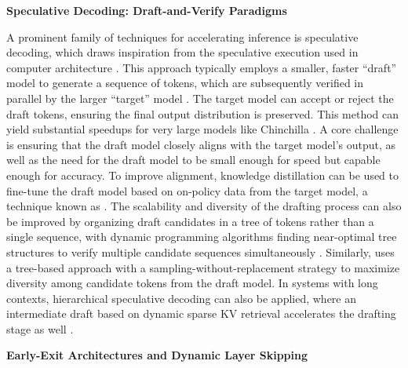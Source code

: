 \documentclass[11pt]{article}
\begin{document}
\textbf{Speculative Decoding: Draft-and-Verify Paradigms}

A prominent family of techniques for accelerating inference is speculative decoding, which draws inspiration from the speculative execution used in computer architecture \cite{ref323}. This approach typically employs a smaller, faster ``draft'' model to generate a sequence of tokens, which are subsequently verified in parallel by the larger ``target'' model \cite{ref324}. The target model can accept or reject the draft tokens, ensuring the final output distribution is preserved. This method can yield substantial speedups for very large models like Chinchilla \cite{ref324}. A core challenge is ensuring that the draft model closely aligns with the target model's output, as well as the need for the draft model to be small enough for speed but capable enough for accuracy. To improve alignment, knowledge distillation can be used to fine-tune the draft model based on on-policy data from the target model, a technique known as \cite{ref325}. The scalability and diversity of the drafting process can also be improved by organizing draft candidates in a tree of tokens rather than a single sequence, with dynamic programming algorithms finding near-optimal tree structures to verify multiple candidate sequences simultaneously \cite{ref326}. Similarly, \cite{ref327} uses a tree-based approach with a sampling-without-replacement strategy to maximize diversity among candidate tokens from the draft model. In systems with long contexts, hierarchical speculative decoding can also be applied, where an intermediate draft based on dynamic sparse KV retrieval accelerates the drafting stage as well \cite{ref328}.

\textbf{Early-Exit Architectures and Dynamic Layer Skipping}
\end{document}
